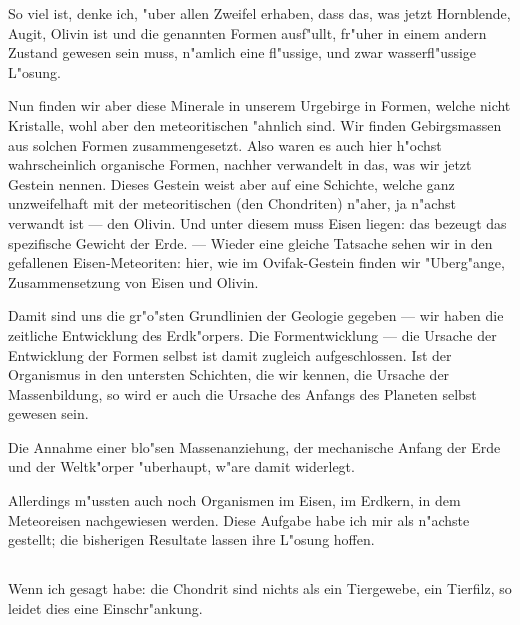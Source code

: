 \documentclass[a4paper, 11pt, oneside]{article}
\begin{document}
So viel ist, denke ich, "uber allen Zweifel erhaben, dass das, was jetzt Hornblende, Augit, Olivin ist und die genannten Formen ausf"ullt, fr"uher in einem andern Zustand gewesen sein muss, n"amlich eine fl"ussige, und zwar wasserfl"ussige L"osung.

Nun finden wir aber diese Minerale in unserem Urgebirge in Formen, welche nicht Kristalle, wohl aber den meteoritischen "ahnlich sind. Wir finden Gebirgsmassen aus solchen Formen zusammengesetzt. Also waren es auch hier h"ochst wahrscheinlich organische Formen, nachher verwandelt in das, was wir jetzt Gestein nennen. Dieses Gestein weist aber auf eine Schichte, welche ganz unzweifelhaft mit der meteoritischen (den Chondriten) n"aher, ja n"achst verwandt ist --- den Olivin. Und unter diesem muss Eisen liegen: das bezeugt das spezifische Gewicht der Erde. --- Wieder eine gleiche Tatsache sehen wir in den gefallenen Eisen-Meteoriten: hier, wie im Ovifak-Gestein finden wir "Uberg"ange, Zusammensetzung von Eisen und Olivin.

Damit sind uns die gr"o"sten Grundlinien der Geologie gegeben --- wir haben die zeitliche Entwicklung des Erdk"orpers. Die Formentwicklung --- die Ursache der Entwicklung der Formen selbst ist damit zugleich aufgeschlossen. Ist der Organismus in den untersten Schichten, die wir kennen, die Ursache der Massenbildung, so wird er auch die Ursache des Anfangs des Planeten selbst gewesen sein.

Die Annahme einer blo"sen Massenanziehung, der mechanische Anfang der Erde und der Weltk"orper "uberhaupt, w"are damit widerlegt.

Allerdings m"ussten auch noch Organismen im Eisen, im Erdkern, in dem Meteoreisen nachgewiesen werden. Diese Aufgabe habe ich mir als n"achste gestellt; die bisherigen Resultate lassen ihre L"osung hoffen.
\clearpage
\subsection{}
\paragraph{}
Wenn ich gesagt habe: die Chondrit sind nichts als ein Tiergewebe, ein Tierfilz, so leidet dies eine Einschr"ankung.
\end{document}
